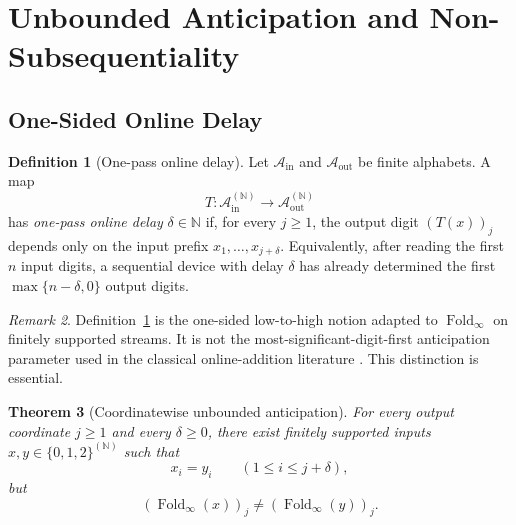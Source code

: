 \documentclass[11pt,letterpaper]{article}
\numberwithin{equation}{section}
\theoremstyle{plain}
\newtheorem{theorem}{Theorem}[section]
\theoremstyle{definition}
\newtheorem{definition}[theorem]{Definition}
\theoremstyle{remark}
\newtheorem{remark}[theorem]{Remark}
\newcommand{\A}{\mathcal{A}}
\newcommand{\NN}{\mathbb{N}}
\DeclareMathOperator{\Fold}{Fold}
\begin{document}
\section{Unbounded Anticipation and Non-Subsequentiality}\label{sec:streaming}

\subsection{One-Sided Online Delay}

\begin{definition}[One-pass online delay]\label{def:online-delay}
Let $\A_{\mathrm{in}}$ and $\A_{\mathrm{out}}$ be finite alphabets.  A map
\[
T:\A_{\mathrm{in}}^{(\NN)}\to \A_{\mathrm{out}}^{(\NN)}
\]
has \emph{one-pass online delay} $\delta\in\NN$ if, for every $j\ge 1$, the
output digit $(T(x))_j$ depends only on the input prefix
$x_1,\dots,x_{j+\delta}$.  Equivalently, after reading the first $n$ input
digits, a sequential device with delay $\delta$ has already determined the
first $\max\{n-\delta,0\}$ output digits.
\end{definition}

\begin{remark}\label{rem:delay-convention}
Definition~\ref{def:online-delay} is the one-sided low-to-high notion adapted
to $\Fold_\infty$ on finitely supported streams.  It is not the
most-significant-digit-first anticipation parameter used in the classical
online-addition literature \cite{Frougny1999OnlineAddition}.  This distinction
is essential.
\end{remark}

\begin{theorem}[Coordinatewise unbounded anticipation]\label{thm:coordinatewise-unbounded-anticipation}
For every output coordinate $j\ge 1$ and every $\delta\ge 0$, there exist
finitely supported inputs $x,y\in\{0,1,2\}^{(\NN)}$ such that
\[
x_i=y_i \qquad (1\le i\le j+\delta),
\]
but
\[
(\Fold_\infty(x))_j\neq (\Fold_\infty(y))_j.
\]
\end{theorem}
\end{document}
